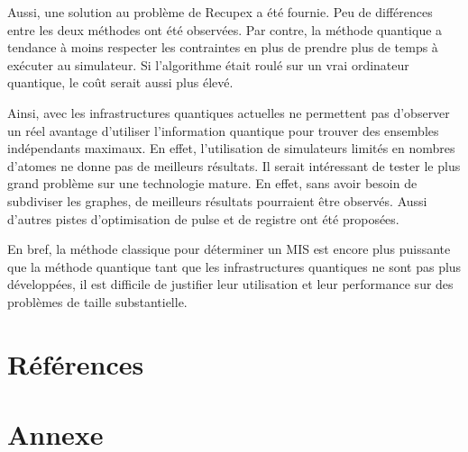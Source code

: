 \documentclass[11pt]{article}
\begin{document}
Aussi, une solution au problème de Recupex a été fournie. Peu de différences entre les deux méthodes ont été observées. Par contre, la méthode quantique a tendance à moins respecter les contraintes en plus de prendre plus de temps à exécuter au simulateur. Si l'algorithme était roulé sur un vrai ordinateur quantique, le coût serait aussi plus élevé.

Ainsi, avec les infrastructures quantiques actuelles ne permettent pas d'observer un réel avantage d'utiliser l'information quantique pour trouver des ensembles indépendants maximaux. En effet, l'utilisation de simulateurs limités en nombres d'atomes ne donne pas de meilleurs résultats. Il serait intéressant de tester le plus grand problème sur une technologie mature. En effet, sans avoir besoin de subdiviser les graphes, de meilleurs résultats pourraient être observés. Aussi d'autres pistes d'optimisation de pulse et de registre ont été proposées.

En bref, la méthode classique pour déterminer un MIS est encore plus puissante que la méthode quantique tant que les infrastructures quantiques ne sont pas plus développées, il est difficile de justifier leur utilisation et leur performance sur des problèmes de taille substantielle.

\section{Références}
\printbibliography[heading=none]

\section{Annexe}
\end{document}
